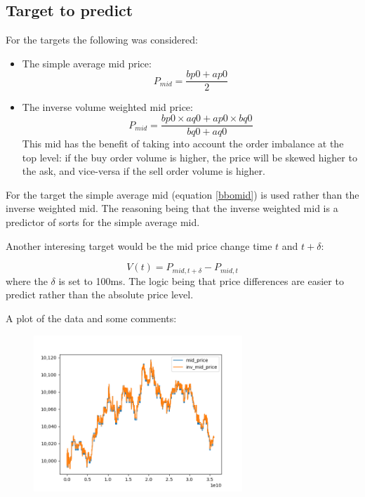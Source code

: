 \documentclass[english, 11pt, a4paper]{article}
\begin{document}
\subsection{Target to predict}
For the targets the following was considered:
\begin{itemize}
    \item The simple average mid price:
        \begin{equation}
            P_{mid} = \frac{bp0 + ap0}{2} \label{bbomid}
        \end{equation}
    \item The inverse volume weighted mid price:
        \begin{equation}
            P_{mid} = \frac{bp0\times aq0 + ap0 \times bq0}{bq0 + aq0}
        \end{equation}
        This mid has the benefit of taking into account the order imbalance at the top level: if
        the buy order volume is higher, the price will be skewed higher to the ask, and vice-versa
        if the sell order volume is higher.
\end{itemize}

For the target the simple average mid (equation \ref{bbomid}) is used rather than the inverse weighted mid. The reasoning
being that the inverse weighted mid is a predictor of sorts for the simple average mid. 

Another interesing target would be the mid price change time $t$ and $t+\delta$:

\begin{equation}
    V(t) = P_{mid, t+\delta} - P_{mid, t}
\end{equation}
where the $\delta$ is set to 100ms. The logic being that price differences are easier to predict
rather than the absolute price level.

A plot of the data and some comments:
 \begin{figure}[H] 
	\centering
	\includegraphics[width=0.70\textwidth]{../data/figures/time_series_20190610_mid_price_inv_mid_price.png}
	\caption{}
	\label{fig2}
\end{figure}
\end{document}

